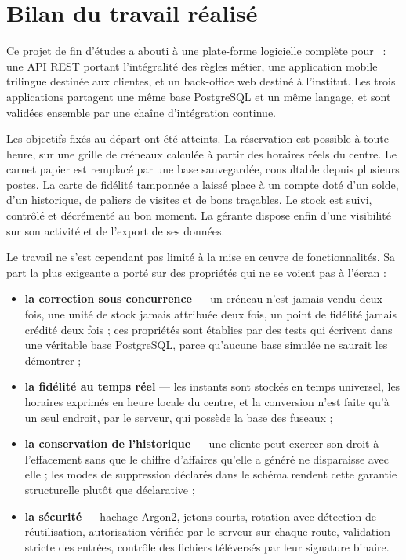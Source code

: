 
\section*{Bilan du travail réalisé}

Ce projet de fin d'études a abouti à une plate-forme logicielle complète pour
\yani\ : une API REST portant l'intégralité des règles métier, une application
mobile trilingue destinée aux clientes, et un back-office web destiné à
l'institut. Les trois applications partagent une même base PostgreSQL et un
même langage, et sont validées ensemble par une chaîne d'intégration continue.

Les objectifs fixés au départ ont été atteints. La réservation est possible à
toute heure, sur une grille de créneaux calculée à partir des horaires réels du
centre. Le carnet papier est remplacé par une base sauvegardée, consultable
depuis plusieurs postes. La carte de fidélité tamponnée a laissé place à un
compte doté d'un solde, d'un historique, de paliers de visites et de bons
traçables. Le stock est suivi, contrôlé et décrémenté au bon moment. La gérante
dispose enfin d'une visibilité sur son activité et de l'export de ses données.

Le travail ne s'est cependant pas limité à la mise en \oe uvre de
fonctionnalités. Sa part la plus exigeante a porté sur des propriétés qui ne se
voient pas à l'écran :

\begin{itemize}[leftmargin=1.2cm]
  \item \textbf{la correction sous concurrence} --- un créneau n'est jamais
  vendu deux fois, une unité de stock jamais attribuée deux fois, un point de
  fidélité jamais crédité deux fois ; ces propriétés sont établies par des
  tests qui écrivent dans une véritable base PostgreSQL, parce qu'aucune base
  simulée ne saurait les démontrer ;

  \item \textbf{la fidélité au temps réel} --- les instants sont stockés en
  temps universel, les horaires exprimés en heure locale du centre, et la
  conversion n'est faite qu'à un seul endroit, par le serveur, qui possède la
  base des fuseaux ;

  \item \textbf{la conservation de l'historique} --- une cliente peut exercer
  son droit à l'effacement sans que le chiffre d'affaires qu'elle a généré ne
  disparaisse avec elle ; les modes de suppression déclarés dans le schéma
  rendent cette garantie structurelle plutôt que déclarative ;

  \item \textbf{la sécurité} --- hachage Argon2, jetons courts, rotation avec
  détection de réutilisation, autorisation vérifiée par le serveur sur chaque
  route, validation stricte des entrées, contrôle des fichiers téléversés par
  leur signature binaire.
\end{itemize}

